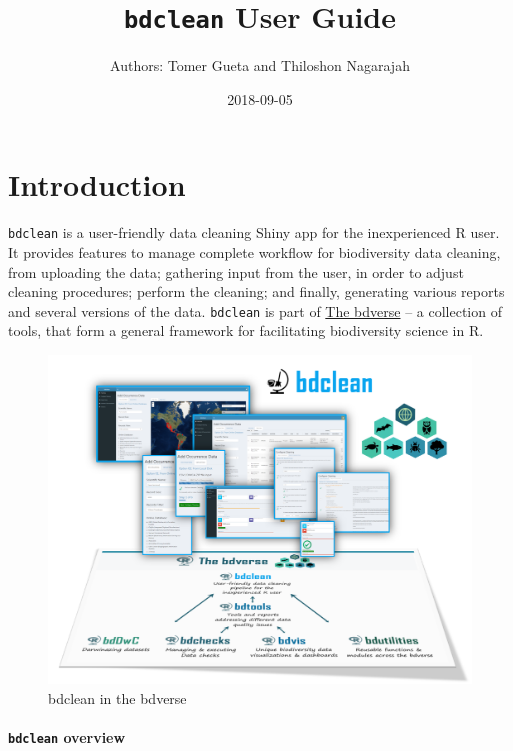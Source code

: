 \documentclass[]{book}
\title{\texttt{bdclean} User Guide}
\author{Authors: Tomer Gueta and Thiloshon Nagarajah}
\date{2018-09-05}
\begin{document}
\maketitle

{
\setcounter{tocdepth}{1}
\tableofcontents
}
\chapter*{Introduction}\label{introduction}

\texttt{bdclean} is a user-friendly data cleaning Shiny app for the
inexperienced R user. It provides features to manage complete workflow
for biodiversity data cleaning, from uploading the data; gathering input
from the user, in order to adjust cleaning procedures; perform the
cleaning; and finally, generating various reports and several versions
of the data. \texttt{bdclean} is part of
\href{https://bd-r.github.io/The-bdverse/index.html}{The bdverse} -- a
collection of tools, that form a general framework for facilitating
biodiversity science in R.

\begin{figure}
\centering
\includegraphics{img/bdclean_bdverse.png}
\caption{bdclean in the bdverse}
\end{figure}

\subsubsection*{\texorpdfstring{\texttt{bdclean}
overview}{bdclean overview}}\label{bdclean-overview}
\end{document}

